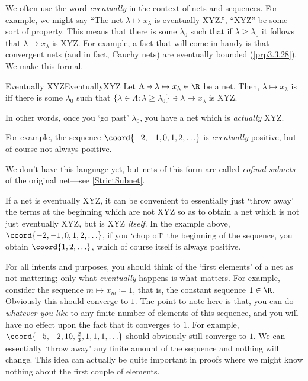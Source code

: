 We often use the word \emph{eventually} in the context of nets and sequences.  For example, we might say ``The net $\lambda \mapsto x_\lambda$ is eventually XYZ.'', ``XYZ'' be some sort of property.  This means that there is some $\lambda _0$ such that if $\lambda \geq \lambda _0$ it follows that $\lambda \mapsto x_\lambda$ is XYZ.  For example, a fact that will come in handy is that convergent nets (and in fact, Cauchy nets) are eventually bounded (\cref{prp3.3.28}).  We make this formal.
\begin{mdf}{Eventually XYZ}{EventuallyXYZ}
Let $\Lambda \ni \lambda \mapsto x_\lambda \in \R$ be a net.  Then, $\lambda \mapsto x_\lambda$ is  iff there is some $\lambda _0$ such that $\{ \lambda \in \Lambda :\lambda \geq \lambda _0\} \ni \lambda \mapsto x_\lambda$ is XYZ.
\begin{rmk}
In other words, once you `go past' $\lambda _0$, you have a net which is \emph{actually} XYZ.
\end{rmk}
\begin{rmk}
For example, the sequence $\coord{-2,-1,0,1,2,\ldots }$ is \emph{eventually} positive, but of course not always positive.
\end{rmk}
\begin{rmk}
We don't have this language yet, but nets of this form are called \emph{cofinal subnets} of the original net---see \cref{StrictSubnet}.
\end{rmk}
\end{mdf}

If a net is eventually XYZ, it can be convenient to essentially just `throw away' the terms at the beginning which are not XYZ so as to obtain a net which is not just eventually XYZ, but is XYZ \emph{itself}.  In the example above, $\coord{-2,-1,0,1,2,\ldots}$, if you `chop off' the beginning of the sequence, you obtain $\coord{1,2,\ldots}$, which of course itself is always positive.

For all intents and purposes, you should think of the `first elements' of a net as not mattering; only what \emph{eventually} happens is what matters.  For example, consider the sequence $m\mapsto x_m\coloneqq 1$, that is, the constant sequence $1\in \R$.  Obviously this should converge to $1$.  The point to note here is that, you can do \emph{whatever you like} to any finite number of elements of this sequence, and you will have no effect upon the fact that it converges to $1$.  For example, $\coord{-5,-2,10,\frac{2}{3},1,1,1,\ldots}$ should obviously still converge to $1$.  We can essentially `throw away' any finite amount of the sequence and nothing will change.  This idea can actually be quite important in proofs where we might know nothing about the first couple of elements.

